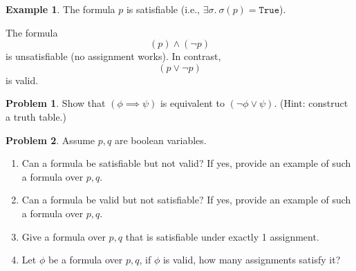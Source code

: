\documentclass[oneside,11pt,dvipsnames]{book}
\numberwithin{equation}{section}
\theoremstyle{definition}
\newtheorem{example}{Example}[section]
\newtheorem{problem}{Problem}[section]
\theoremstyle{remark}
\begin{document}
\begin{example} The formula $p$ is satisfiable (i.e., $\exists \sigma.~\sigma(p) = \texttt{True}$).


\noindent The formula
\[
(p) \land (\lnot{p})
\]
is unsatisfiable (no assignment works).
In contrast,
\[
(p \lor \lnot{p})
\]
is valid.
\end{example}

\begin{problem}
Show that $(\phi \implies \psi)$ is equivalent to $(\lnot \phi \lor \psi)$.
(Hint: construct a truth table.)
\end{problem}

\begin{problem}\label{problem:short-questions}
    Assume $p,q$ are boolean variables.
    \begin{enumerate}
        \item Can a formula be satisfiable but not valid?  If yes, provide an example of such a formula over $p,q$.
        \item Can a formula be valid but not satisfiable? If yes, provide an example of such a formula over $p,q$.
        \item Give a formula over $p,q$ that is satisfiable under exactly 1 assignment.
        \item Let $\phi$ be a formula over $p,q$, if $\phi$ is valid, how many assignments satisfy it?
    \end{enumerate}
\end{problem}
\end{document}

